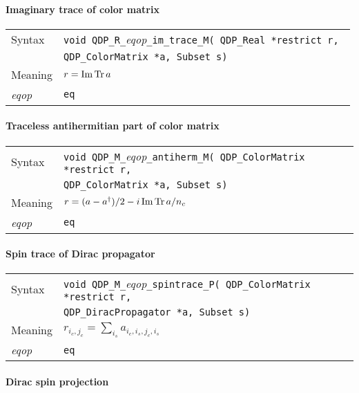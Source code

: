 \documentclass{article}
\renewcommand{\Im}{\mathop{\rm Im}}
\newcommand{\Tr}{\mathop{\rm Tr}}
\newcommand{\tReal}{QDP\ttdash Real }
\newcommand{\tColorMatrix}{QDP\ttdash ColorMatrix }
\newcommand{\tDiracPropagator}{QDP\ttdash DiracPropagator }
\newcommand{\namespace}{QDP}
\newcommand{\ttdash}{{\tt \_}}
\newcommand{\extraarg}{, Subset s}
\newcommand{\protoUnarySingleTypesQual}[5]{{\tt void \namespace}\ttdash{\tt #1}\ttdash{\it eqop}\ttdash#2\ttdash{\tt #3}{\tt ( #4 *restrict r, }\\
  & {\tt #5 *a\extraarg)}}
\begin{document}
\paragraph{Imaginary trace of color matrix}

\begin{flushleft}
  \begin{tabular}{|l|l|}
  \hline
  Syntax      & \protoUnarySingleTypesQual{R}{\tt im\_trace}{M}{\tReal}{\tColorMatrix} \\
  \hline
  Meaning     & $r = \Im\Tr a$ \\
  \hline
  {\it eqop}  & {\tt eq} \\
  \hline
  \end{tabular}
\end{flushleft}

\paragraph{Traceless antihermitian part of color matrix}

\begin{flushleft}
  \begin{tabular}{|l|l|}
  \hline
  Syntax      & \protoUnarySingleTypesQual{M}{\tt antiherm}{M}{\tColorMatrix}{\tColorMatrix}\\
  \hline
  Meaning     & $r = (a - a^\dagger)/2 - i\Im \Tr a/n_c$ \\
  \hline
  {\it eqop}  & {\tt eq} \\
  \hline
  \end{tabular}
\end{flushleft}

\paragraph{Spin trace of Dirac propagator}

\begin{flushleft}
  \begin{tabular}{|l|l|}
  \hline
  Syntax      & \protoUnarySingleTypesQual{M}{\tt spintrace}{P}{\tColorMatrix}{\tDiracPropagator} \\
  \hline
  Meaning     & $r_{i_c,j_c} = \sum_{i_s} a_{i_c,i_s,j_c,i_s}$ \\
  \hline
  {\it eqop}  & {\tt eq} \\
  \hline
  \end{tabular}
\end{flushleft}

\paragraph{Dirac spin projection}
\end{document}
